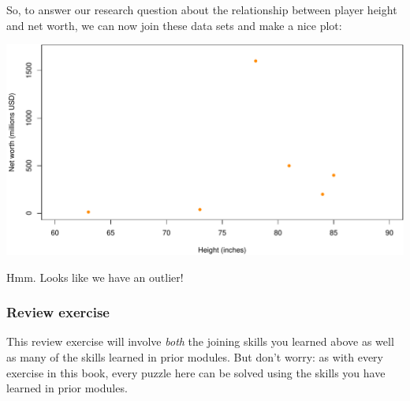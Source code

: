 \documentclass[
]{book}
\newenvironment{Shaded}{\begin{snugshade}}{\end{snugshade}}
\newcommand{\DataTypeTok}[1]{\textcolor[rgb]{0.13,0.29,0.53}{#1}}
\newcommand{\DecValTok}[1]{\textcolor[rgb]{0.00,0.00,0.81}{#1}}
\newcommand{\KeywordTok}[1]{\textcolor[rgb]{0.13,0.29,0.53}{\textbf{#1}}}
\newcommand{\NormalTok}[1]{#1}
\newcommand{\OperatorTok}[1]{\textcolor[rgb]{0.81,0.36,0.00}{\textbf{#1}}}
\newcommand{\StringTok}[1]{\textcolor[rgb]{0.31,0.60,0.02}{#1}}
\begin{document}
So, to answer our research question about the relationship between player height and net worth, we can now join these data sets and make a nice plot:

\begin{Shaded}
\end{Shaded}

\includegraphics{figures/unnamed-chunk-226-1.pdf}

Hmm. Looks like we have an outlier!

\hypertarget{review-exercise-4}{%
\subsubsection*{Review exercise}\label{review-exercise-4}}

This review exercise will involve \emph{both} the joining skills you learned above as well as many of the skills learned in prior modules. But don't worry: as with every exercise in this book, every puzzle here can be solved using the skills you have learned in prior modules.
\end{document}
